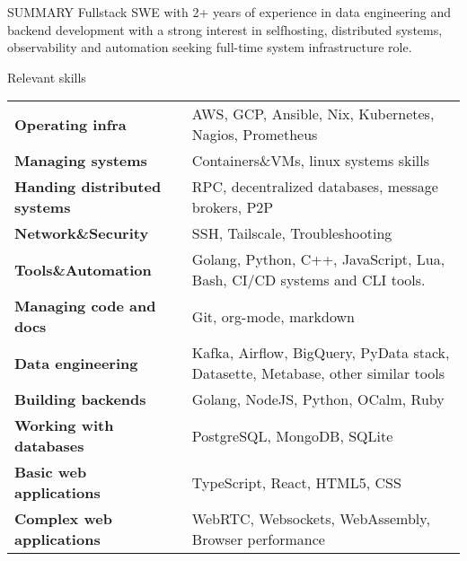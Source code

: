 \documentclass{resume} %
\begin{document}

\begin{rSection}{SUMMARY}
  {Fullstack SWE with 2+ years of experience in data engineering and backend development with a strong interest in selfhosting, distributed systems, observability and automation seeking full-time system infrastructure role.}
\end{rSection}

\begin{rSection}{Relevant skills}
  \begin{tabular}{ @{} >{\bfseries}l @{\hspace{6ex}} l }
    Operating infra & AWS, GCP, Ansible, Nix, Kubernetes, Nagios, Prometheus\\
    Managing systems & Containers\&VMs, linux systems skills\\
    Handing distributed systems & RPC, decentralized databases, message brokers, P2P\\
    Network\&Security & SSH, Tailscale, Troubleshooting\\
    Tools\&Automation & Golang, Python, C++, JavaScript, Lua, Bash, CI/CD systems and CLI tools.\\
    Managing code and docs & Git, org-mode, markdown\\
    Data engineering & Kafka, Airflow, BigQuery, PyData stack, Datasette, Metabase, other similar tools\\
    Building backends & Golang, NodeJS, Python, OCalm, Ruby\\
    Working with databases & PostgreSQL, MongoDB, SQLite\\
    Basic web applications & TypeScript, React, HTML5, CSS\\
    Complex web applications & WebRTC, Websockets, WebAssembly, Browser performance\\
  \end{tabular}\
\end{rSection}
\end{document}
